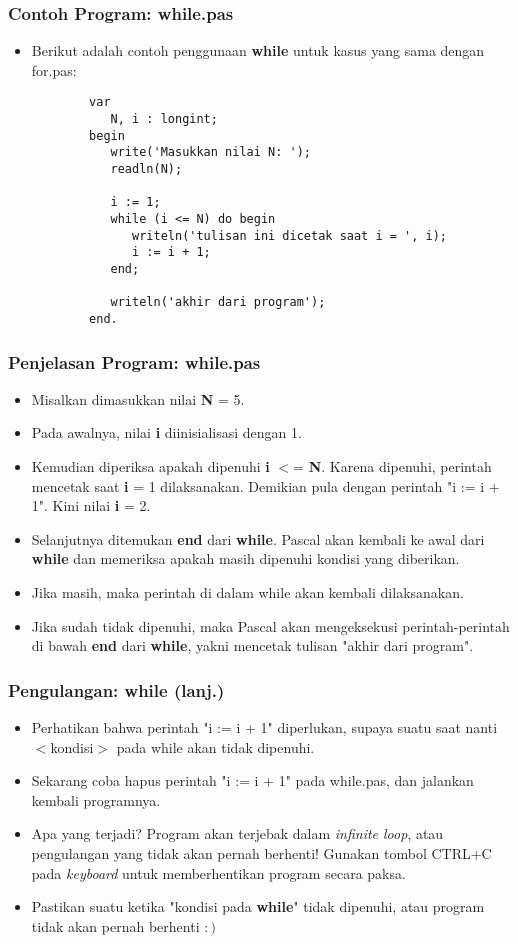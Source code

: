 \documentclass{beamer}
\begin{document}
\begin{frame}[fragile]
\frametitle{Contoh Program: while.pas}
\begin{itemize}
	\item Berikut adalah contoh penggunaan \textbf{while} untuk kasus yang sama dengan for.pas:
	\begin{lstlisting}
		var
		   N, i : longint;
		begin
		   write('Masukkan nilai N: ');
		   readln(N);
		
		   i := 1;
		   while (i <= N) do begin
		      writeln('tulisan ini dicetak saat i = ', i);
		      i := i + 1;
		   end;
		
		   writeln('akhir dari program');
		end.
	\end{lstlisting}
\end{itemize}
\end{frame}

\begin{frame}
\frametitle{Penjelasan Program: while.pas}
\begin{itemize}
	\item Misalkan dimasukkan nilai \textbf{N} = 5.
	\item Pada awalnya, nilai \textbf{i} diinisialisasi dengan 1.
	\item Kemudian diperiksa apakah dipenuhi \textbf{i} $<$= \textbf{N}. Karena dipenuhi, perintah mencetak saat \textbf{i} = 1 dilaksanakan. Demikian pula dengan perintah "i := i + 1". Kini nilai \textbf{i} = 2.
	\item Selanjutnya ditemukan \textbf{end} dari \textbf{while}. Pascal akan kembali ke awal dari \textbf{while} dan memeriksa apakah masih dipenuhi kondisi yang diberikan.
	\item Jika masih, maka perintah di dalam while akan kembali dilaksanakan.
	\item Jika sudah tidak dipenuhi, maka Pascal akan mengeksekusi perintah-perintah di bawah \textbf{end} dari \textbf{while}, yakni mencetak tulisan "akhir dari program".
\end{itemize}
\end{frame}

\begin{frame}
\frametitle{Pengulangan: while (lanj.)}
\begin{itemize}
	\item Perhatikan bahwa perintah "i := i + 1" diperlukan, supaya suatu saat nanti $<$kondisi$>$ pada while akan tidak dipenuhi.
	\item Sekarang coba hapus perintah "i := i + 1" pada while.pas, dan jalankan kembali programnya.
	\item Apa yang terjadi? Program akan terjebak dalam \alert{\textit{infinite loop}}, atau \alert{pengulangan yang tidak akan pernah berhenti}! Gunakan tombol CTRL+C pada \textit{keyboard} untuk memberhentikan program secara paksa.
	\item Pastikan suatu ketika "kondisi pada \textbf{while}" tidak dipenuhi, atau program tidak akan pernah berhenti $:)$
\end{itemize}
\end{frame}
\end{document}
